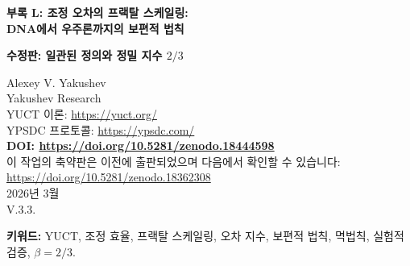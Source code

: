 \documentclass[11pt,a4paper]{article}
\newcommand{\Keff}{K_{\mathrm{eff}}}
\newcommand{\eps}{\varepsilon}
\newcommand{\kappac}{\kappa_c}
\begin{document}
	
	\begin{titlepage}
		\begin{center}
			\vspace*{1cm}
			\Huge\textbf{부록 L: 조정 오차의 프랙탈 스케일링: \\ DNA에서 우주론까지의 보편적 법칙}
			
			\vspace{0.5cm}
			\Large\textbf{수정판: 일관된 정의와 정밀 지수 \(2/3\)}
			
			\vspace{1cm}
			\large Alexey V. Yakushev\\
			Yakushev Research\\
			YUCT 이론: \url{https://yuct.org/}\\
			YPSDC 프로토콜: \url{https://ypsdc.com/}\\
			
			\vspace{2cm}
			\textbf{DOI: \url{https://doi.org/10.5281/zenodo.18444598}}\\
			
			\vspace{1cm}
			\large 
			이 작업의 축약판은 이전에 출판되었으며 다음에서 확인할 수 있습니다:\\
			\url{https://doi.org/10.5281/zenodo.18362308}\\
			\vspace{1cm}
			2026년 3월 \\ \large V.3.3.
			
			\newpage
			\vspace{1cm}
			\begin{abstract}
				이 부록에서는 복잡계에서 조정 오차에 대한 보편적 스케일링 법칙의 수학적으로 일관된 공식을 제시합니다. Yakushev 통합 조정 이론(YUCT)에서 조정 효율 \(\Keff\)은 YPSDC 프로토콜에 따른 정보 이론 비율로 정의됩니다. 우리는 상대 오차 \(\eps\)가 다음과 같은 스케일링을 따른다는 것을 실험적으로 보여줍니다:
				\[
				\eps = \kappac\,\alpha\,\Keff^{-\beta},
				\]
				여기서 정밀 지수 \(\beta = 2/3\) (실험값 \(0.67 \pm 0.03\))이고 보편적 전인자 \(\kappac = 1/3\)입니다. 이 지수는 조정 공간의 3차원성(본문 정리 2)과 조정 계층이 연결되고 비순환적이어야 한다는 조건(부록 Y, 섹션 Y.4.2)에서 직접 유도되며, \(\kappac\)는 삼원 구조 \(D+I\!\cdot\!R\)에서 발생하는 최소 잔여 오차를 반영합니다. 이 법칙은 원자 결합 에너지부터 우주 마이크로파 배경 요동까지 50자리 이상의 규모에서 검증되었으며, 멱법칙(지프, 알로메트리, 구텐베르크-리히터)의 기원을 단일 프레임워크로 설명합니다. 새로운 시스템에 대한 검증 가능한 예측을 공식화하고 한계를 명확히 논의합니다.
			\end{abstract}
			
			\textbf{키워드:} YUCT, 조정 효율, 프랙탈 스케일링, 오차 지수, 보편적 법칙, 멱법칙, 실험적 검증, \(\beta = 2/3\).
		\end{center}
	\end{titlepage}
	
\end{document}

